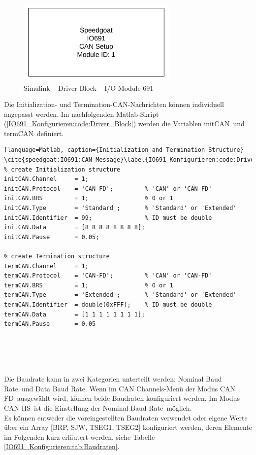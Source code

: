 \pagebreak[1]
\begin{figure}[!ht]
	\begin{center}
		\includegraphics[width=0.7\textwidth]{img/4_simulink/IO691.png}
		\caption{Simulink – Driver Block – I/O Module 691 \cite{speedgoat:IO691}}
		\label{IO691_Konfigurieren:img:Driver_Block}
	\end{center}
\end{figure}
\pagebreak[1]


Die \frqq Initialization\flqq- und \frqq Termination\flqq-CAN-Nachrichten können individuell angepasst werden. Im nachfolgenden Matlab-Skript (\ref{IO691_Konfigurieren:code:Driver_Block}) werden die Variablen \frqq initCAN\flqq\ und \frqq termCAN\flqq\ definiert.



\pagebreak[4]
\begin{lstlisting}[language=Matlab, caption={Initialization and Termination Structure} \cite{speedgoat:IO691:CAN_Message}\label{IO691_Konfigurieren:code:Driver_Block}]
% create Initialization structure
initCAN.Channel     = 1;
initCAN.Protocol    = 'CAN-FD';         % 'CAN' or 'CAN-FD'
initCAN.BRS         = 1;                % 0 or 1
initCAN.Type        = 'Standard';       % 'Standard' or 'Extended'
initCAN.Identifier  = 99;               % ID must be double
initCAN.Data        = [8 8 8 8 8 8 8 8];
initCAN.Pause       = 0.05;

% create Termination structure
termCAN.Channel     = 1;
termCAN.Protocol    = 'CAN-FD';         % 'CAN' or 'CAN-FD'
termCAN.BRS         = 1;                % 0 or 1
termCAN.Type        = 'Extended';       % 'Standard' or 'Extended'     
termCAN.Identifier  = double(0xFFF);    % ID must be double
termCAN.Data        = [1 1 1 1 1 1 1 1];
termCAN.Pause       = 0.05



 
\end{lstlisting}
\pagebreak[1]

Die Baudrate kann in zwei Kategorien unterteilt werden: \frqq Nominal Baud Rate\flqq\ und \frqq Data Baud Rate\flqq. Wenn im \frqq CAN Channels\flqq-Menü der Modus \frqq CAN FD\flqq\ ausgewählt wird, können beide Baudraten konfiguriert werden. Im Modus \frqq CAN HS\flqq\ ist die Einstellung der \frqq Nominal Baud Rate\flqq\ möglich. \\
Es können entweder die voreingestellten Baudraten verwendet oder eigene Werte über ein Array [BRP, SJW, TSEG1, TSEG2] konfiguriert werden, deren Elemente im Folgenden kurz erläutert werden, siehe Tabelle \ref{IO691_Konfigurieren:tab:Baudraten}.

